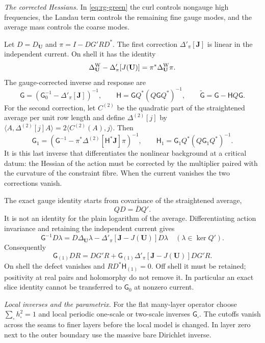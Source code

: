 \documentclass[11pt,letterpaper,reqno]{amsart}
\theoremstyle{definition}
\theoremstyle{remark}
\begin{document}
\emph{The corrected Hessians.}
In \eqref{eq:rg-green} the curl controls nongauge high
frequencies, the Landau
term controls the remaining fine gauge modes, and the
average mass controls the coarse modes.

Let $D=D_{\mathbf U}$ and $\pi=I-DG'RD^*$. The first
correction $\Delta'_\pi[\mathbf J]$ is linear in the
independent current. On shell it has the identity
\[
 \Delta_{\mathbf U}^{\rm W}-\Delta'_\pi[J(\mathbf U)]
                     =\pi^*\Delta_{\mathbf U}^{\rm W}\pi.
\]
The gauge-corrected inverse and response are
\[
 \mathsf G=(\mathsf G_0^{-1}-\Delta'_\pi[\mathbf J])^{-1},
 \qquad \mathsf H=\mathsf GQ^*(Q\mathsf GQ^*)^{-1},
 \qquad \widetilde{\mathsf G}=\mathsf G-\mathsf HQ\mathsf G.
\]
For the second correction, let $C^{(2)}$ be the quadratic
part of the straightened average per unit row length and
define $\Delta^{(2)}[j]$ by
$\langle A,\Delta^{(2)}[j]A\rangle
=2\langle C^{(2)}(A),j\rangle$. Then
\[
 \mathsf G_1=
  (\mathsf G^{-1}-\pi^*\Delta^{(2)}[\mathsf H^*\mathbf J]\pi)^{-1},
 \qquad \mathsf H_1=\mathsf G_1Q^*(Q\mathsf G_1Q^*)^{-1}.
\]
It is this last inverse that differentiates the nonlinear
background at a critical datum: the Hessian of the action
must be corrected by the multiplier paired with the
curvature of the constraint fibre. When the current vanishes
the two corrections vanish.

The exact gauge identity starts from covariance of the
straightened average,
\[
 QD=\bar DQ'.
\]
It is not an identity for the plain logarithm of the
average. Differentiating action invariance and retaining
the independent current gives
\[
 \mathsf G^{-1}D\lambda
  =D\Delta_{\mathbf U}\lambda
          -\Delta'_\pi[\mathbf J-J(\mathbf U)]D\lambda
       \quad(\lambda\in\ker Q').
\]
Consequently
\[
 \mathsf G_{(1)}DR
 =DG'R+\mathsf G_{(1)}\Delta'_\pi[\mathbf J-J(\mathbf U)]DG'R.
\]
On shell the defect vanishes and
$RD^*\mathsf H_{(1)}=0$. Off shell it must be retained;
positivity at real pairs and holomorphy do not remove it.
In particular an exact slice identity cannot be transferred
to $\mathsf G_0$ at nonzero current.

\emph{Local inverses and the parametrix.}
For the flat many-layer operator choose
$\sum_\square h_\square^2=1$ and local periodic
one-scale or two-scale inverses $\mathsf G_\square$.
The cutoffs vanish across the seams to finer layers before
the local model is changed. In layer zero next to the
outer boundary use the massive bare Dirichlet inverse.
\end{document}
